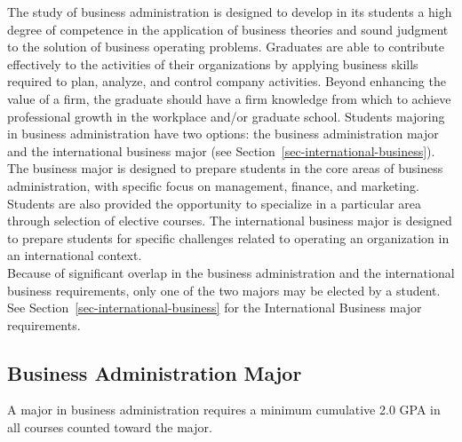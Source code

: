 \documentclass[
  letterpaper,
]{scrbook}
\begin{document}
The study of business administration is designed to develop in its
students a high degree of competence in the application of business
theories and sound judgment to the solution of business operating
problems. Graduates are able to contribute effectively to the activities
of their organizations by applying business skills required to plan,
analyze, and control company activities. Beyond enhancing the value of a
firm, the graduate should have a firm knowledge from which to achieve
professional growth in the workplace and/or graduate school. Students
majoring in business administration have two options: the business
administration major and the international business major (see
Section~\ref{sec-international-business}). The business major is
designed to prepare students in the core areas of business
administration, with specific focus on management, finance, and
marketing. Students are also provided the opportunity to specialize in a
particular area through selection of elective courses. The international
business major is designed to prepare students for specific challenges
related to operating an organization in an international context.\\
Because of significant overlap in the business administration and the
international business requirements, only one of the two majors may be
elected by a student. See Section~\ref{sec-international-business} for
the International Business major requirements.

\subsection{Business Administration
Major}\label{business-administration-major}

A major in business administration requires a minimum cumulative 2.0 GPA
in all courses counted toward the major.
\end{document}
